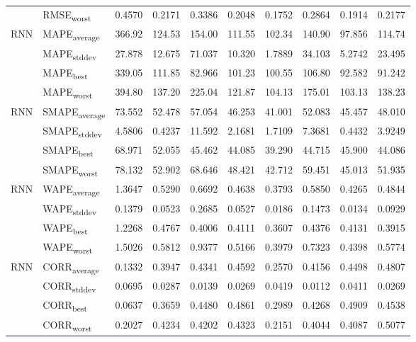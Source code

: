 {\begin{longtable}{l l c c c c c c c c}
 & RMSE\textsubscript{worst} & 0.4570 & 0.2171 & 0.3386 & 0.2048 & 0.1752 & 0.2864 & 0.1914 & 0.2177 \\
\cmidrule(lr){2-10}
\multirow{4}{*}{RNN} & MAPE\textsubscript{average} & 366.92 & 124.53 & 154.00 & 111.55 & 102.34 & 140.90 & 97.856 & 114.74 \\
 & MAPE\textsubscript{stddev} & 27.878 & 12.675 & 71.037 & 10.320 & 1.7889 & 34.103 & 5.2742 & 23.495 \\
 & MAPE\textsubscript{best} & 339.05 & 111.85 & 82.966 & 101.23 & 100.55 & 106.80 & 92.582 & 91.242 \\
 & MAPE\textsubscript{worst} & 394.80 & 137.20 & 225.04 & 121.87 & 104.13 & 175.01 & 103.13 & 138.23 \\
\cmidrule(lr){2-10}
\multirow{4}{*}{RNN} & SMAPE\textsubscript{average} & 73.552 & 52.478 & 57.054 & 46.253 & 41.001 & 52.083 & 45.457 & 48.010 \\
 & SMAPE\textsubscript{stddev} & 4.5806 & 0.4237 & 11.592 & 2.1681 & 1.7109 & 7.3681 & 0.4432 & 3.9249 \\
 & SMAPE\textsubscript{best} & 68.971 & 52.055 & 45.462 & 44.085 & 39.290 & 44.715 & 45.900 & 44.086 \\
 & SMAPE\textsubscript{worst} & 78.132 & 52.902 & 68.646 & 48.421 & 42.712 & 59.451 & 45.013 & 51.935 \\
\cmidrule(lr){2-10}
\multirow{4}{*}{RNN} & WAPE\textsubscript{average} & 1.3647 & 0.5290 & 0.6692 & 0.4638 & 0.3793 & 0.5850 & 0.4265 & 0.4844 \\
 & WAPE\textsubscript{stddev} & 0.1379 & 0.0523 & 0.2685 & 0.0527 & 0.0186 & 0.1473 & 0.0134 & 0.0929 \\
 & WAPE\textsubscript{best} & 1.2268 & 0.4767 & 0.4006 & 0.4111 & 0.3607 & 0.4376 & 0.4131 & 0.3915 \\
 & WAPE\textsubscript{worst} & 1.5026 & 0.5812 & 0.9377 & 0.5166 & 0.3979 & 0.7323 & 0.4398 & 0.5774 \\
\cmidrule(lr){2-10}
\multirow{4}{*}{RNN} & CORR\textsubscript{average} & 0.1332 & 0.3947 & 0.4341 & 0.4592 & 0.2570 & 0.4156 & 0.4498 & 0.4807 \\
 & CORR\textsubscript{stddev} & 0.0695 & 0.0287 & 0.0139 & 0.0269 & 0.0419 & 0.0112 & 0.0411 & 0.0269 \\
 & CORR\textsubscript{best} & 0.0637 & 0.3659 & 0.4480 & 0.4861 & 0.2989 & 0.4268 & 0.4909 & 0.4538 \\
 & CORR\textsubscript{worst} & 0.2027 & 0.4234 & 0.4202 & 0.4323 & 0.2151 & 0.4044 & 0.4087 & 0.5077 \\

\end{longtable}}
